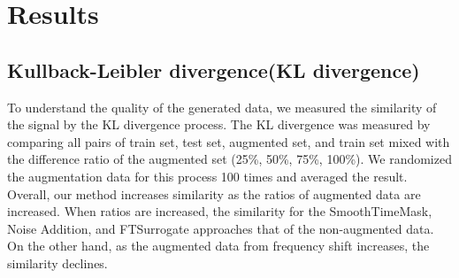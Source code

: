 \section{Results}

\subsection{Kullback-Leibler divergence(KL divergence)}
To understand the quality of the generated data, we measured the similarity of the signal by the KL divergence process.
The KL divergence was measured by comparing all pairs of train set, test set, augmented set, and train set mixed with the difference ratio of the augmented set (25\%, 50\%, 75\%, 100\%).
We randomized the augmentation data for this process 100 times and averaged the result.
Overall, our method increases similarity as the ratios of augmented data are increased.
When ratios are increased, the similarity for the SmoothTimeMask, Noise Addition, and FTSurrogate approaches that of the non-augmented data.
On the other hand, as the augmented data from frequency shift increases, the similarity declines.

